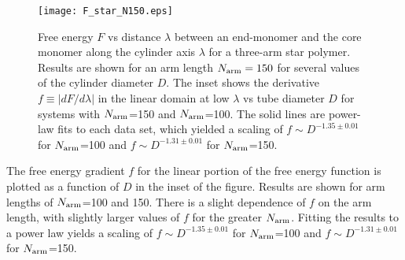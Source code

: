 \documentclass[journal=mamobx,manuscript=article,layout=twocolumn]{achemso}
\begin{document}
\begin{figure}[!ht]
\begin{center}
\texttt{[image: F\_star\_N150.eps]}
\end{center}
\caption{
Free energy $F$ vs distance $\lambda$ between an end-monomer and the core monomer along the
cylinder axis $\lambda$ for a three-arm star polymer. Results are shown for
an arm length $N_{\rm arm}=150$ for several values of the cylinder diameter $D$. 
The inset shows the derivative $f\equiv |dF/d\lambda|$ in the linear domain at low $\lambda$
vs tube diameter $D$ for systems with $N_{\rm arm}$=150 and $N_{\rm arm}$=100.
The solid lines are power-law fits to each data set, which yielded a scaling
of $f \sim D^{-1.35\pm 0.01}$ for $N_{\rm arm}$=100 and $f \sim D^{-1.31\pm 0.01}$ for 
$N_{\rm arm}$=150.
}
\label{F_star_N150}
\end{figure}

The free energy gradient $f$ for the linear portion of the free energy function
is plotted as a function of $D$ in the inset of the figure. Results are shown for
arm lengths of $N_{\rm arm}$=100 and 150. There is a slight dependence of
$f$ on the arm length, with slightly larger values of $f$ for the greater $N_{\rm arm}$.
Fitting the results to a power law yields a scaling of $f \sim D^{-1.35\pm 0.01}$
for $N_{\rm arm}$=100 and $f \sim D^{-1.31\pm 0.01}$ for $N_{\rm arm}$=150.
\end{document}
